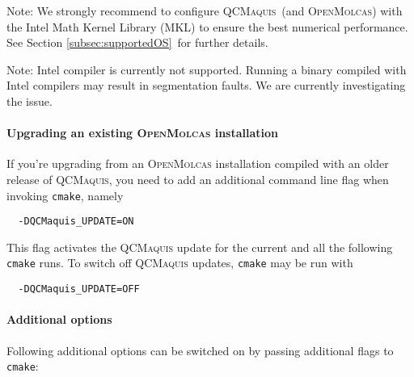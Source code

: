\documentclass[bibliography=totoc,12pt,a4paper]{scrartcl}
\newcommand{\mol}{\textsc{OpenMolcas}}
\newcommand{\qcm}{\textsc{QCMaquis}}
\begin{document}
\begin{framed}
  \noindent\large{Note: We strongly recommend to configure \qcm\ (and \mol) with the Intel Math Kernel Library (MKL) to ensure the best numerical performance.
  See Section \ref{subsec:supportedOS}\ for further details.}
\end{framed}

\begin{framed}
  \noindent Note: Intel compiler is currently not supported. Running a binary compiled with Intel compilers may result in segmentation faults.
  We are currently investigating the issue.
\end{framed}

\paragraph{Upgrading an existing \mol{} installation}
\label{sec:build-upgrade}$\;$\\

If you're upgrading from an \mol{} installation compiled with an older release of \qcm{}, you need to add an additional command line flag when invoking \texttt{cmake}, namely

\begin{verbatim}
  -DQCMaquis_UPDATE=ON
\end{verbatim}

This flag activates the \qcm{} update for the current and all the following \texttt{cmake} runs. To switch off \qcm{} updates, \texttt{cmake} may be run with

\begin{verbatim}
  -DQCMaquis_UPDATE=OFF
\end{verbatim}


\paragraph{Additional options}$\;$\\

Following additional options can be switched on by passing additional flags to \texttt{cmake}:
\end{document}

